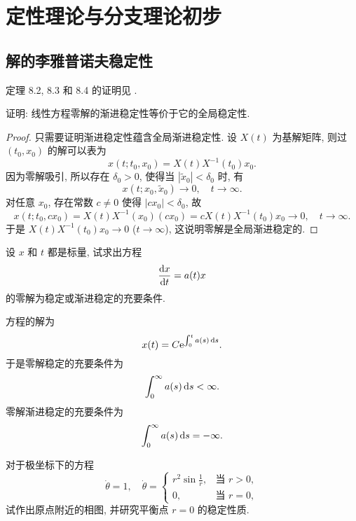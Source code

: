 \chapter{定性理论与分支理论初步}



\setcounter{section}{1}
\section{解的李雅普诺夫稳定性}

定理 8.2, 8.3 和 8.4 的证明见 \cite{R-Yuan}.

\begin{exercise}
  证明: 线性方程零解的渐进稳定性等价于它的全局稳定性.
\end{exercise}

\begin{proof}
  只需要证明渐进稳定性蕴含全局渐进稳定性.
  设 $X(t)$ 为基解矩阵, 则过 $(t_0, x_0)$ 的解可以表为
  \[x(t; t_0,x_0) = X(t) X^{-1}(t_0)x_0.\]
  因为零解吸引, 所以存在 $\delta_0>0$, 使得当 $|\tilde{x}_0| < \delta_0$ 时, 有
  \[x(t; x_0, \tilde{x}_0) \to 0,\quad t\to\infty.\]
  对任意 $x_0$, 存在常数 $c\neq 0$ 使得 $|c x_0| < \delta_0$, 故
  \[x(t; t_0, cx_0) = X(t)X^{-1}(x_0)(cx_0) = c X(t)X^{-1}(t_0)x_0 \to 0,\quad t\to\infty.\]
  于是 $X(t)X^{-1}(t_0)x_0\to 0$ ($t\to\infty$), 这说明零解是全局渐进稳定的.
\end{proof}


\begin{exercise}
  设 $x$ 和 $t$ 都是标量, 试求出方程
  \[\frac{\mathop{}\!\mathrm{d} x}{\mathop{}\!\mathrm{d} t} = a(t)x\]
  的零解为稳定或渐进稳定的充要条件.
\end{exercise}

\begin{solution}
  方程的解为
  \[x(t) = C \mathrm{e}^{\int_0^t a(s) \mathop{}\!\mathrm{d} s}.\]
  于是零解稳定的充要条件为
  \[\int_0^{\infty} a(s) \mathop{}\!\mathrm{d} s < \infty.\]
  零解渐进稳定的充要条件为
  \[\int_0^{\infty} a(s) \mathop{}\!\mathrm{d} s = -\infty. \qedhere\]
\end{solution}


\begin{exercise}
  对于极坐标下的方程
  \[\dot{\theta} = 1,\quad \dot{\theta} = \begin{cases}
    r^2\sin\frac{1}{r}, & \text{当\ } r>0, \\
    0, & \text{当\ } r=0,
  \end{cases}\]
  试作出原点附近的相图, 并研究平衡点 $r=0$ 的稳定性质.
\end{exercise}



